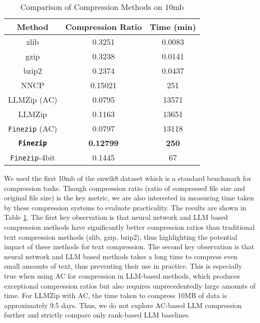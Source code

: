 \documentclass[11pt]{article}
\begin{document}
\begin{table}
\small
\centering
\begin{tabular}{|c|c|c|}
\hline
\textbf{Method} & \textbf{Compression Ratio} & \textbf{Time (min)} \\ \hline
zlib& 0.3251&0.0083\\\hline
gzip& 0.3238&0.0141\\\hline
bzip2& 0.2374&0.0437\\\hline
NNCP & 0.15021 & 251 \\ \hline
LLMZip (AC)& 0.0795& 13571\\ \hline  %
LLMZip & 0.1163& 13651\\ \hline
\texttt{Finezip} (AC) & 0.0797&13118\\\hline
\textbf{\texttt{Finezip}} & \textbf{0.12799} & \textbf{250} \\\hline
\texttt{Finezip}-4bit & 0.1445 & 67 \\\hline

\end{tabular}
\caption{Comparison of Compression Methods on 10mb}
\label{tab:compression_methods}
\end{table}




We used the first 10mb of the enwik8 \cite{enwik8} dataset which is a standard benchmark for compression tasks. Though compression ratio (ratio of compressed file size and original file size) is the key metric, we are also interested in measuring time taken by these compression systems to evaluate practicality. The results are shown in Table \ref{tab:compression_methods}. The first key observation is that neural network and LLM based compression methods have significantly better compression ratios than traditional text compression methods (zlib, gzip, bzip2), thus highlighting the potential impact of these methods for text compression. The second key observation is that neural network and LLM based methods takes a long time to compress even small amounts of text, thus preventing their use in practice. This is especially true when using AC for compression in LLM-based methods, which produces exceptional compression ratios but also requires unprecedentedly large amounts of time. For LLMZip with AC, the time taken to compress 10MB of data is approximately 9.5 days. Thus, we do not explore AC-based LLM compression further and strictly compare only rank-based LLM baselines.
\end{document}
